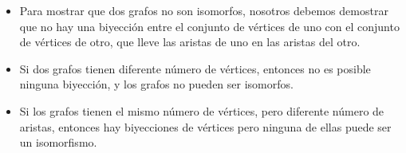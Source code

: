 \documentclass[handout]{beamer} %
\begin{document}
    \begin{frame}
        \begin{itemize}
            \item Para mostrar que dos grafos no son isomorfos, nosotros debemos
            demostrar que no hay una biyección entre el conjunto de vértices
            de uno con el conjunto de vértices de otro, que lleve las aristas
            de uno en las aristas del otro.\pause
            \item     Si dos grafos tienen diferente número de vértices, entonces no es
            posible ninguna biyección, y los grafos no pueden ser isomorfos.\pause
            \item Si los grafos tienen el mismo número de vértices, pero di\-fe\-ren\-te
            número de aristas, entonces hay biyecciones de vértices  pero ninguna de ellas
            puede ser un isomorfismo. 
        \end{itemize}
        
        
        
        
        
    \end{frame}
    
\end{document}
